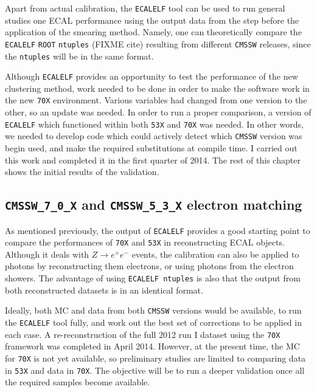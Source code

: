 \documentclass[10pt]{article}
\begin{document}
Apart from actual calibration, the \texttt{ECALELF} tool can be used to run general studies one ECAL performance using the output data from the step before the application of the smearing method. Namely, one can theoretically compare the \texttt{ECALELF} \texttt{ROOT} \texttt{ntuples} (FIXME cite) resulting from different \texttt{CMSSW} releases, since the \texttt{ntuples} will be in the same format.

Although \texttt{ECALELF} provides an opportunity to test the performance of the new clustering method, work needed to be done in order to make the software work in the new \texttt{70X} environment. Various variables had changed from one version to the other, so an update was needed. In order to run a proper comparison, a version of \texttt{ECALELF} which functioned within both \texttt{53X} and \texttt{70X} was needed. In other words, we needed to develop code which could actively detect which \texttt{CMSSW} version was begin used, and make the required substitutions at compile time. I carried out this work and completed it in the first quarter of 2014. The rest of this chapter shows the initial results of the validation.

\subsection{\texttt{CMSSW\_7\_0\_X} and \texttt{CMSSW\_5\_3\_X} electron matching}

As mentioned previously, the output of \texttt{ECALELF} provides a good starting point to compare the performances of \texttt{70X} and \texttt{53X} in reconstructing ECAL objects. Although it deals with $Z\rightarrow e^+ e^-$ events, the calibration can also be applied to photons by reconstructing them electrons, or using photons from the electron showers. The advantage of using \texttt{ECALELF ntuples} is also that the output from both reconstructed datasets is in an identical format.

Ideally, both MC and data from both \texttt{CMSSW} versions would be available, to run the \texttt{ECALELF} tool fully, and work out the best set of corrections to be applied in each case. A re-reconstruction of the full 2012 run I dataset using the \texttt{70X} framework was completed in April 2014. However, at the present time, the MC for \texttt{70X} is not yet available, so preliminary studies are limited to comparing data in \texttt{53X} and data in \texttt{70X}. The objective will be to run a deeper validation once all the required samples become available.
\end{document}
